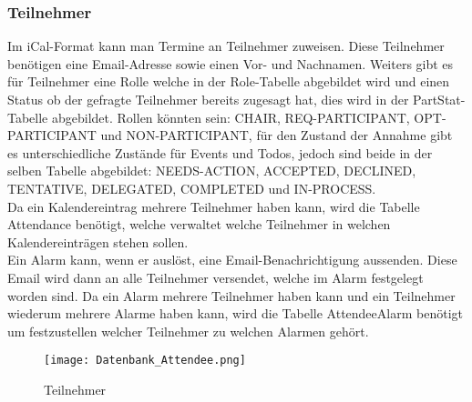 \subsubsection*{Teilnehmer}
\label{ref:teilnehmer}
Im iCal-Format kann man Termine an Teilnehmer zuweisen. Diese Teilnehmer benötigen eine Email-Adresse sowie einen Vor- und Nachnamen. Weiters gibt es für Teilnehmer eine Rolle welche in der Role-Tabelle abgebildet wird und einen Status ob der gefragte Teilnehmer bereits zugesagt hat, dies wird in der PartStat-Tabelle abgebildet. Rollen könnten sein: CHAIR, REQ-PARTICIPANT, OPT-PARTICIPANT und NON-PARTICIPANT, für den Zustand der Annahme gibt es unterschiedliche Zustände für Events und Todos, jedoch sind beide in der selben Tabelle abgebildet: NEEDS-ACTION, ACCEPTED, DECLINED, TENTATIVE, DELEGATED, COMPLETED und IN-PROCESS.\\
Da ein Kalendereintrag mehrere Teilnehmer haben kann, wird die Tabelle Attendance benötigt, welche verwaltet welche Teilnehmer in welchen Kalendereinträgen stehen sollen.\\
Ein Alarm kann, wenn er auslöst, eine Email-Benachrichtigung aussenden. Diese Email wird dann an alle Teilnehmer versendet, welche im Alarm festgelegt worden sind. Da ein Alarm mehrere Teilnehmer haben kann und ein Teilnehmer wiederum mehrere Alarme haben kann, wird die Tabelle AttendeeAlarm benötigt um festzustellen welcher Teilnehmer zu welchen Alarmen gehört.
\begin{figure}[H]
	\texttt{[image: Datenbank\_Attendee.png]}
    \caption{Teilnehmer}
    \label{fig:datenbankTeilnehmer}
\end{figure}
\pagebreak